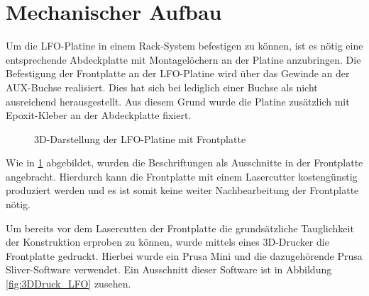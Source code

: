 \newpage

\section{Mechanischer Aufbau}
Um die LFO-Platine in einem Rack-System befestigen zu können, ist es nötig eine entsprechende Abdeckplatte mit Montagelöchern an der Platine anzubringen. 
Die Befestigung der Frontplatte an der LFO-Platine wird über das Gewinde an der AUX-Buchse realisiert. Dies hat sich bei lediglich einer Buchse als nicht ausreichend herausgestellt. Aus diesem Grund wurde die Platine zusätzlich mit Epoxit-Kleber an der Abdeckplatte fixiert.

\begin{figure}[h]
	\centering
	\setlength{\fboxsep}{1pt} %
	\setlength{\fboxrule}{1pt} %
	\caption{3D-Darstellung der LFO-Platine mit Frontplatte}
	\label{fig:Frontplatte_LFO}
\end{figure}
\FloatBarrier

Wie in \ref{fig:Frontplatte_LFO} abgebildet, wurden die Beschriftungen als Ausschnitte in der Frontplatte angebracht. Hierdurch kann die Frontplatte mit einem Lasercutter kostengünstig produziert werden und es ist somit keine weiter Nachbearbeitung der Frontplatte nötig.

Um bereits vor dem Lasercutten der Frontplatte die grundsätzliche Tauglichkeit der Konstruktion erproben zu können, wurde mittels eines 3D-Drucker die Frontplatte gedruckt. Hierbei wurde ein \grqq{}Prusa Mini\grqq{} und die dazugehörende \grqq{}Prusa Sliver\grqq{}-Software verwendet. Ein Ausschnitt dieser Software ist in Abbildung \ref{fig:3DDruck_LFO} zusehen.


